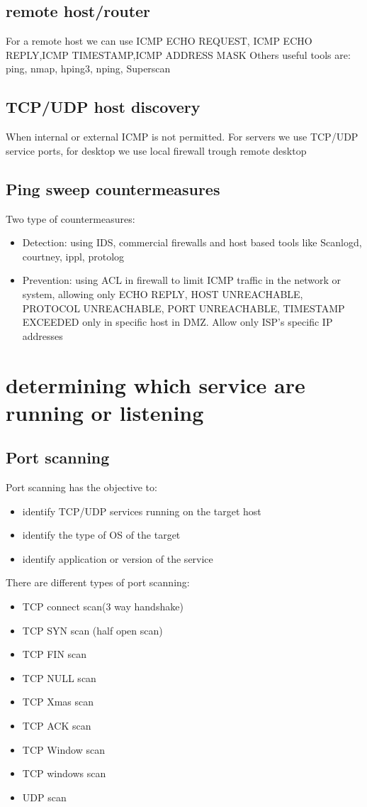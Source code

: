 \subsection{remote host/router}
For a remote host we can use ICMP ECHO REQUEST, ICMP ECHO REPLY,ICMP TIMESTAMP,ICMP ADDRESS MASK
Others useful tools are: ping, nmap, hping3, nping, Superscan

\subsection{TCP/UDP host discovery}
When internal or external ICMP is not permitted.
For servers we use TCP/UDP service ports, for desktop we use local firewall trough remote desktop

\subsection{Ping sweep countermeasures}
Two type of countermeasures:
\begin{itemize}
    \item Detection: using IDS, commercial firewalls and host based tools like Scanlogd, courtney, ippl, protolog
    \item Prevention: using ACL in firewall to limit ICMP traffic in the network or system, allowing only ECHO REPLY, HOST UNREACHABLE, PROTOCOL UNREACHABLE, PORT UNREACHABLE, TIMESTAMP EXCEEDED only in specific host in DMZ. Allow only ISP's specific IP addresses
\end{itemize}

\section{determining which service are running or listening}
\subsection{Port scanning}
Port scanning has the objective to:
\begin{itemize}
    \item identify TCP/UDP services running on the target host
    \item identify the type of OS of the target
    \item identify application or version of the service
\end{itemize}

There are different types of port scanning:
\begin{itemize}
    \item TCP connect scan(3 way handshake)
    \item TCP SYN scan (half open scan)
    \item TCP FIN scan
    \item TCP NULL scan
    \item TCP Xmas scan
    \item TCP ACK scan
    \item TCP Window scan
    \item TCP windows scan
    \item UDP scan
\end{itemize}

